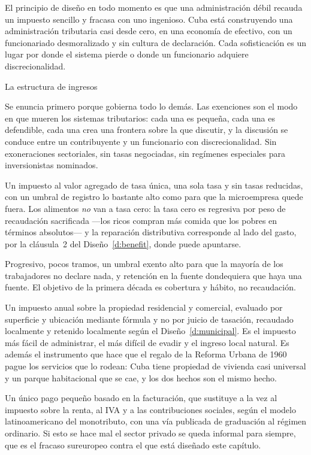 El principio de diseño en todo momento es que una administración débil recauda un
impuesto sencillo y fracasa con uno ingenioso. Cuba está construyendo una
administración tributaria casi desde cero, en una economía de efectivo, con un
funcionariado desmoralizado y sin cultura de declaración. Cada sofisticación es un
lugar por donde el sistema pierde o donde un funcionario adquiere discrecionalidad.

\begin{design}{La estructura de ingresos}
\label{d:tax}
\begin{rules}
 Se enuncia primero porque gobierna
todo lo demás. Las exenciones son el modo en que mueren los sistemas tributarios: cada
una es pequeña, cada una es defendible, cada una crea una frontera sobre la que
discutir, y la discusión se conduce entre un contribuyente y un funcionario con
discrecionalidad. Sin exoneraciones sectoriales, sin tasas negociadas, sin regímenes
especiales para inversionistas nominados.

 Un impuesto al valor agregado de tasa única, una
sola tasa y sin tasas reducidas, con un umbral de registro lo bastante alto como para
que la microempresa quede fuera. Los alimentos \emph{no} van a tasa cero: la tasa cero
es regresiva por peso de recaudación sacrificada ---los ricos compran más comida que
los pobres en términos absolutos--- y la reparación distributiva corresponde al lado
del gasto, por la cláusula~2 del Diseño~\ref{d:benefit}, donde puede apuntarse.

 Progresivo, pocos tramos, un
umbral exento alto para que la mayoría de los trabajadores no declare nada, y
retención en la fuente dondequiera que haya una fuente. El objetivo de la primera
década es cobertura y hábito, no recaudación.

 Un impuesto anual sobre la propiedad residencial y
comercial, evaluado por superficie y ubicación mediante fórmula y no por juicio de
tasación, recaudado localmente y retenido localmente según el Diseño~\ref{d:municipal}.
Es el impuesto más fácil de administrar, el más difícil de evadir y el ingreso local
natural. Es además el instrumento que hace que el regalo de la Reforma Urbana de 1960
pague los servicios que lo rodean: Cuba tiene propiedad de vivienda casi universal y un
parque habitacional que se cae, y los dos hechos son el mismo hecho.

 Un único pago pequeño basado en la
facturación, que sustituye a la vez al impuesto sobre la renta, al IVA y a las
contribuciones sociales, según el modelo latinoamericano del monotributo, con una vía
publicada de graduación al régimen ordinario. Si esto se hace mal el sector privado se
queda informal para siempre, que es el fracaso sureuropeo contra el que está diseñado
este capítulo.


\end{rules}
\end{design}
